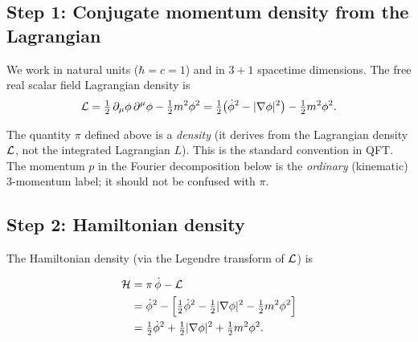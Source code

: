 \subsection*{Step 1: Conjugate momentum density from the Lagrangian}

We work in natural units ($\hbar=c=1$) and in $3+1$ spacetime
dimensions.  The free real scalar field Lagrangian density is
\begin{equation}
  \mathcal{L}
  = \tfrac{1}{2}\,\partial_\mu\phi\,\partial^\mu\phi - \tfrac{1}{2}m^2\phi^2
  = \tfrac{1}{2}\bigl(\dot{\phi}^2 - |\nabla\phi|^2\bigr) - \tfrac{1}{2}m^2\phi^2.
  \label{eq:lec03:L}
\end{equation}


\begin{remark}
The quantity $\pi$ defined above is a \emph{density} (it derives from
the Lagrangian density $\mathcal{L}$, not the integrated Lagrangian $L$).
This is the standard convention in QFT.  The momentum $p$ in the
Fourier decomposition below is the \emph{ordinary} (kinematic) 3-momentum
label; it should not be confused with $\pi$.
\end{remark}

\subsection*{Step 2: Hamiltonian density}

The Hamiltonian density (via the Legendre transform of $\mathcal{L}$) is

\begin{align}
  \mathcal{H}
  &= \pi\,\dot{\phi} - \mathcal{L} \notag \\
  &= \dot\phi^2
     - \Bigl[\tfrac{1}{2}\dot\phi^2
             - \tfrac{1}{2}|\nabla\phi|^2
             - \tfrac{1}{2}m^2\phi^2\Bigr] \notag \\
  &= \tfrac{1}{2}\dot\phi^2
     + \tfrac{1}{2}|\nabla\phi|^2
     + \tfrac{1}{2}m^2\phi^2.
  \label{eq:lec03:H}
\end{align}

